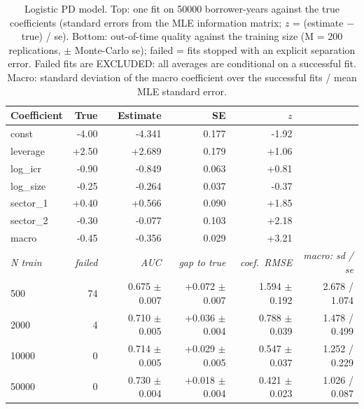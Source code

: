 \begin{table}[H]
\centering
\scriptsize
\caption{Logistic PD model. Top: one fit on 50000 borrower-years against the true coefficients (standard errors from the MLE information matrix; $z$ = (estimate $-$ true) / se). Bottom: out-of-time quality against the training size (M = 200 replications, $\pm$ Monte-Carlo se); failed = fits stopped with an explicit separation error. Failed fits are EXCLUDED: all averages are conditional on a successful fit. Macro: standard deviation of the macro coefficient over the successful fits / mean MLE standard error.}
\label{tab:C1_pd_model}
\setlength{\tabcolsep}{4pt}
\begin{tabular}{lrrrrr}
\toprule
Coefficient & True & Estimate & SE & $z$ &  \\
\midrule
const & -4.00 & -4.341 & 0.177 & -1.92 &  \\
leverage & +2.50 & +2.689 & 0.179 & +1.06 &  \\
log\_icr & -0.90 & -0.849 & 0.063 & +0.81 &  \\
log\_size & -0.25 & -0.264 & 0.037 & -0.37 &  \\
sector\_1 & +0.40 & +0.566 & 0.090 & +1.85 &  \\
sector\_2 & -0.30 & -0.077 & 0.103 & +2.18 &  \\
macro & -0.45 & -0.356 & 0.029 & +3.21 &  \\
\midrule
\textit{N train} & \textit{failed} & \textit{AUC} & \textit{gap to true} & \textit{coef.\ RMSE} & \textit{macro: sd / se} \\
500 & 74 & 0.675 $\pm$ 0.007 & +0.072 $\pm$ 0.007 & 1.594 $\pm$ 0.192 & 2.678 / 1.074 \\
2000 & 4 & 0.710 $\pm$ 0.005 & +0.036 $\pm$ 0.004 & 0.788 $\pm$ 0.039 & 1.478 / 0.499 \\
10000 & 0 & 0.714 $\pm$ 0.005 & +0.029 $\pm$ 0.005 & 0.547 $\pm$ 0.037 & 1.252 / 0.229 \\
50000 & 0 & 0.730 $\pm$ 0.004 & +0.018 $\pm$ 0.004 & 0.421 $\pm$ 0.023 & 1.026 / 0.087 \\
\bottomrule
\end{tabular}
\end{table}
